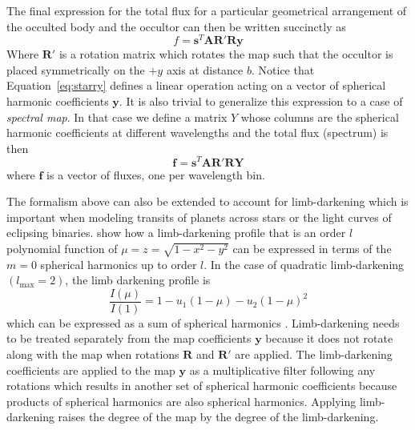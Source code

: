 \documentclass[12pt,dvipsnames]{report}
\begin{document}
The final expression for the total flux for a particular geometrical
arrangement of the occulted body and the occultor can then be written
succinctly as
\begin{equation}
    f = \mathbf{s}^T\mathbf{A}\mathbf{R}'\mathbf{R}\mathbf{y}
    \label{eq:starry}
\end{equation}
Where $\mathbf{R}'$ is a rotation matrix which rotates the map such that the occultor
is placed symmetrically on the $+y$ axis at distance $b$.
Notice that Equation~\ref{eq:starry} defines a linear operation acting on a vector
of spherical harmonic coefficients $\mathbf{y}$.
It is also trivial to generalize this expression to a case of \emph{spectral map}. In
that case we define a matrix $Y$ whose columns are the spherical harmonic coefficients
at different wavelengths and the total flux (spectrum) is then
\begin{equation}
    \mathbf{f} = \mathbf{s}^T\mathbf{A}\mathbf{R}'\mathbf{R}\mathbf{Y}
    \label{eq:starry_mw}
\end{equation}
where $\mathbf{f}$ is a vector of fluxes, one per wavelength bin.

The formalism above can also be extended to account for limb-darkening which is
important when modeling transits of planets across stars or the light curves of
eclipsing binaries. \citet{2020AJ....159..123A} show how a limb-darkening
profile that is an order $l$ polynomial function of
$\mu=z=\sqrt{1-x^{2}-y^{2}}$ can be expressed in terms of the $m=0$ spherical
harmonics up to order $l$. In the case of quadratic limb-darkening
$(l_\mathrm{max}=2)$, the limb darkening profile is
\begin{equation}
    \frac{I(\mu)}{I(1)}=1-u_{1}(1-\mu)-u_{2}(1-\mu)^{2}
\end{equation}
which can be expressed as a sum of spherical harmonics
\citep[Equation 38 in][]{2019AJ....157...64L}. Limb-darkening needs to be
treated separately from the map coefficients $\mathbf{y}$ because it does not rotate along with the map
when rotations $\mathbf{R}$ and $\mathbf{R}'$ are applied. The limb-darkening
coefficients are applied to the map $\mathbf{y}$ as a multiplicative filter
following any rotations which results in another set of spherical harmonic
coefficients because products of spherical harmonics are also spherical
harmonics. Applying limb-darkening raises the degree of the map by the degree
of the limb-darkening.
\end{document}

